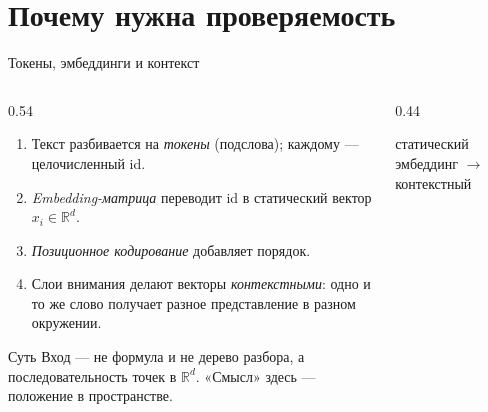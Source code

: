 \documentclass[aspectratio=169,11pt]{beamer}
\begin{document}
\section{Почему нужна проверяемость}

\begin{frame}[shrink=4]{Токены, эмбеддинги и контекст}
  \small
  \begin{columns}[T,onlytextwidth]
    \begin{column}{0.54\textwidth}
      \begin{enumerate}
        \item Текст разбивается на \emph{токены} (подслова); каждому —
              целочисленный id.
        \item \emph{Embedding-матрица} переводит id в статический вектор
              \(x_i\in\mathbb{R}^d\).
        \item \emph{Позиционное кодирование} добавляет порядок.
        \item Слои внимания делают векторы \emph{контекстными}: одно и то же
              слово получает разное представление в разном окружении.
      \end{enumerate}
      \begin{block}{Суть}
        Вход — не формула и не дерево разбора, а последовательность точек
        в \(\mathbb{R}^d\). «Смысл» здесь — положение в пространстве.
      \end{block}
    \end{column}
    \begin{column}{0.44\textwidth}
      \centering

      \smallskip
      {\scriptsize статический эмбеддинг \(\to\) контекстный}
    \end{column}
  \end{columns}
\end{frame}
\end{document}
